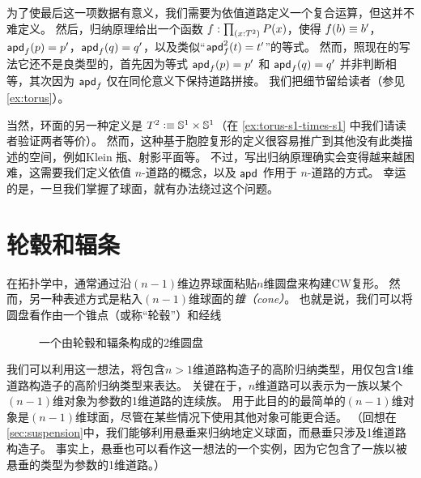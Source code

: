 为了使最后这一项数据有意义，我们需要为依值道路定义一个复合运算，但这并不难定义。
然后，归纳原理给出一个函数 $f:\prd{x:T^2} P(x)$，使得 $f(b)\equiv b'$，$\mathsf{apd}_{f}\mathopen{}\left(p\right)\mathclose{} = p'$，$\mathsf{apd}_{f}\mathopen{}\left(q\right)\mathclose{} = q'$，以及类似“$\mathsf{apd}^2_{f}\mathopen{}\left(t\right)\mathclose{} = t'$”的等式。
然而，照现在的写法它还不是良类型的，首先因为等式 $\mathsf{apd}_{f}\mathopen{}\left(p\right)\mathclose{} = p'$ 和 $\mathsf{apd}_{f}\mathopen{}\left(q\right)\mathclose{} = q'$ 并非判断相等，其次因为 $\mathsf{apd}_{f}$ 仅在同伦意义下保持道路拼接。
我们把细节留给读者（参见 \cref{ex:torus}）。

当然，环面的另一种定义是 $T^2 \vcentcolon\equiv \mathbb{S}^1 \times \mathbb{S}^1$（在 \cref{ex:torus-s1-times-s1} 中我们请读者验证两者等价）。
%
%
然而，这种基于胞腔复形的定义很容易推广到其他没有此类描述的空间，例如Klein 瓶、射影平面等。
不过，写出归纳原理确实会变得越来越困难，这需要我们定义依值 $n$-道路的概念，以及 $\mathsf{apd}_{}$ 作用于 $n$-道路的方式。
幸运的是，一旦我们掌握了球面，就有办法绕过这个问题。

\section{轮毂和辐条}
\label{sec:hubs-spokes}

%
%

在拓扑学中，通常通过沿$(n-1)$维边界球面粘贴$n$维圆盘来构建CW复形。
%
然而，另一种表述方式是粘入$(n-1)$维球面的\emph{锥（cone）}。
也就是说，我们可以将圆盘看作由一个锥点（或称``轮毂''）和经线%

\begin{figure}
  \centering
  \caption{一个由轮毂和辐条构成的2维圆盘}
  \label{fig:hub-and-spokes}
\end{figure}

我们可以利用这一想法，将包含$n>1$维道路构造子的高阶归纳类型，用仅包含1维道路构造子的高阶归纳类型来表达。
关键在于，$n$维道路可以表示为一族以某个$(n-1)$维对象为参数的1维道路的连续族。
用于此目的的最简单的$(n-1)$维对象是$(n-1)$维球面，尽管在某些情况下使用其他对象可能更合适。
（回想在\cref{sec:suspension}中，我们能够利用悬垂来归纳地定义球面，而悬垂只涉及1维道路构造子。
事实上，悬垂也可以看作这一想法的一个实例，因为它包含了一族以被悬垂的类型为参数的1维道路。）

